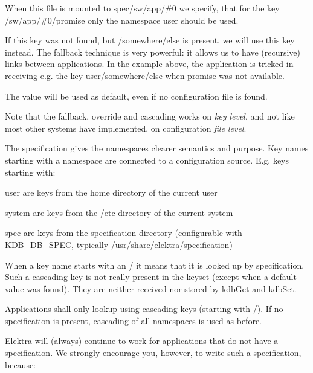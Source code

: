 \begin{DoxyEnumerate}
\item When this file is mounted to {\ttfamily spec/sw/app/\#0} we specify, that for the key {\ttfamily /sw/app/\#0/promise} only the namespace {\ttfamily user} should be used.
\item If this key was not found, but {\ttfamily /somewhere/else} is present, we will use this key instead. The {\ttfamily fallback} technique is very powerful\+: it allows us to have (recursive) links between applications. In the example above, the application is tricked in receiving e.\+g. the key {\ttfamily user/somewhere/else} when {\ttfamily promise} was not available.
\item The value {} will be used as default, even if no configuration file is found.
\end{DoxyEnumerate}

Note that the fallback, override and cascading works on {\itshape key level}, and not like most other systems have implemented, on configuration {\itshape file level}.

The specification gives the namespaces clearer semantics and purpose. Key names starting with a namespace are connected to a configuration source. E.\+g. keys starting with\+:


\begin{DoxyItemize}
\item {\ttfamily user} are keys from the home directory of the current user
\item {\ttfamily system} are keys from the {\ttfamily /etc} directory of the current system
\item {\ttfamily spec} are keys from the specification directory (configurable with {\ttfamily K\+D\+B\+\_\+\+D\+B\+\_\+\+S\+P\+EC}, typically {\ttfamily /usr/share/elektra/specification})
\end{DoxyItemize}

When a key name starts with an {\ttfamily /} it means that it is looked up by specification. Such a cascading key is not really present in the keyset (except when a default value was found). They are neither received nor stored by {\ttfamily kdb\+Get} and {\ttfamily kdb\+Set}.

Applications shall only lookup using cascading keys (starting with {\ttfamily /}). If no specification is present, cascading of all namespaces is used as before.

Elektra will (always) continue to work for applications that do not have a specification. We strongly encourage you, however, to write such a specification, because\+:


